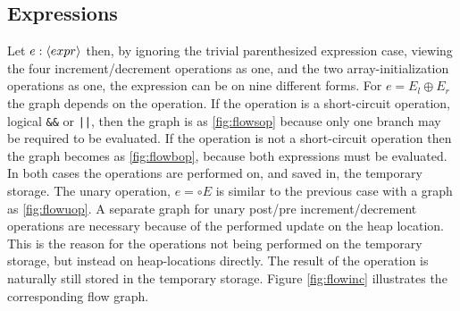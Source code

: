 \subsection{Expressions}

Let $e : \langle expr\rangle$ then, by ignoring the trivial parenthesized expression case, viewing the four increment/decrement operations as one, and the two array-initialization operations as one, the expression can be on nine different forms. For $e = E_l \oplus E_r$ the graph depends on the operation. If the operation is a short-circuit operation, logical \texttt{\&\&} or \texttt{||}, then the graph is as \ref{fig:flowsop} because only one branch may be required to be evaluated. If the operation is not a short-circuit operation then the graph becomes as \ref{fig:flowbop}, because both expressions must be evaluated. In both cases the operations are performed on, and saved in, the temporary storage. The unary operation, $e = \circ E$ is similar to the previous case with a graph as \ref{fig:flowuop}. A separate graph for unary post/pre increment/decrement operations are necessary because of the performed update on the heap location. This is the reason for the operations not being performed on the temporary storage, but instead on heap-locations directly. The result of the operation is naturally still stored in the temporary storage. Figure \ref{fig:flowinc} illustrates the corresponding flow graph.
